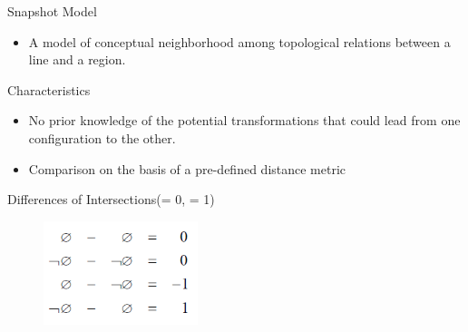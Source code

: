 

\begin{frame}{Snapshot Model}
\begin{itemize}
\item A model of conceptual neighborhood among topological relations between a line and a region.
\end{itemize}

		\begin{block}{Characteristics}
	\begin{itemize}
	
	\item No prior knowledge of the potential transformations that could lead from one configuration to the other. 
	\item Comparison on the basis of a pre-defined distance metric  
	\end{itemize}
	
		\end{block}
		
		\begin{block}{Differences of Intersections(\Empty = 0, \NotEmpty = 1)}
		\begin{figure}
		\begin{center}
			\includegraphics[width = 0.4\textwidth]{images/snapshotdiff.png}
		\end{center}
		\end{figure}
		\end{block}
	\end{frame}